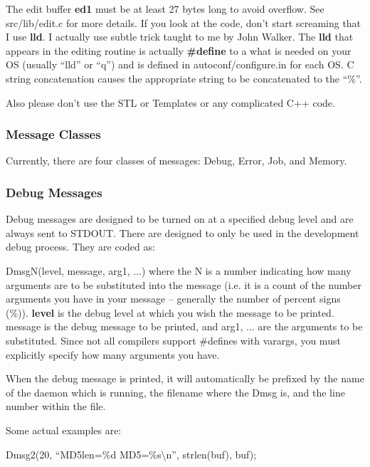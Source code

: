 The edit buffer {\bf ed1} must be at least 27 bytes long to avoid overflow.
See src/lib/edit.c for more details. If you look at the code, don't start
screaming that I use {\bf lld}. I actually use subtle trick taught to me by
John Walker. The {\bf lld} that appears in the editing routine is actually
{\bf \#define} to a what is needed on your OS (usually ``lld'' or ``q'') and
is defined in autoconf/configure.in for each OS. C string concatenation causes
the appropriate string to be concatenated to the ``\%''. 

Also please don't use the STL or Templates or any complicated C++ code. 

\subsubsection*{Message Classes}

Currently, there are four classes of messages: Debug, Error, Job, and Memory. 

\subsubsection*{Debug Messages}

Debug messages are designed to be turned on at a specified debug level and are
always sent to STDOUT. There are designed to only be used in the development
debug process. They are coded as: 

DmsgN(level, message, arg1, ...) where the N is a number indicating how many
arguments are to be substituted into the message (i.e. it is a count of the
number arguments you have in your message -- generally the number of percent
signs (\%)). {\bf level} is the debug level at which you wish the message to
be printed. message is the debug message to be printed, and arg1, ... are the
arguments to be substituted. Since not all compilers support \#defines with
varargs, you must explicitly specify how many arguments you have. 

When the debug message is printed, it will automatically be prefixed by the
name of the daemon which is running, the filename where the Dmsg is, and the
line number within the file. 

Some actual examples are: 

Dmsg2(20, ``MD5len=\%d MD5=\%s\textbackslash{}n'', strlen(buf), buf); 

